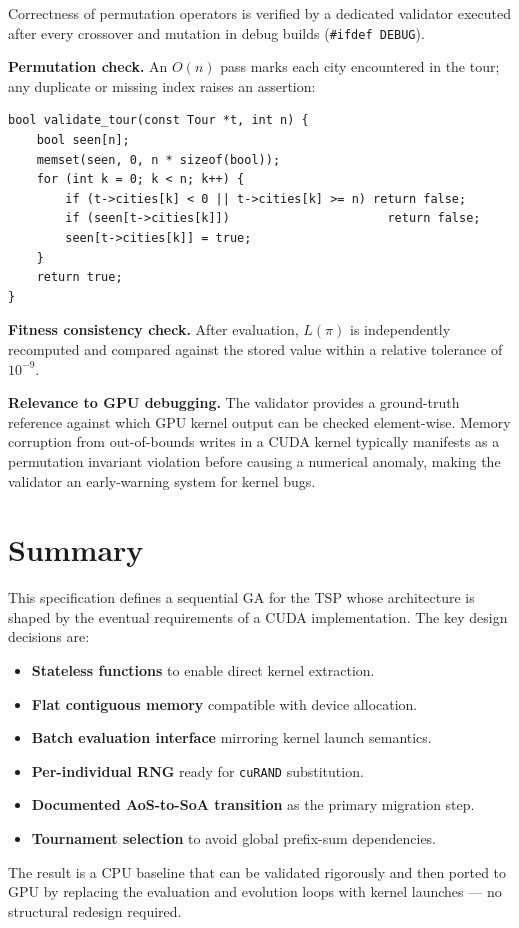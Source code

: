 \documentclass[11pt, letterpaper]{article}
\begin{document}
Correctness of permutation operators is verified by a dedicated validator
executed after every crossover and mutation in debug builds (\texttt{\#ifdef
DEBUG}).

\textbf{Permutation check.}  An $O(n)$ pass marks each city encountered in
the tour; any duplicate or missing index raises an assertion:

\begin{lstlisting}[caption={Tour validation.}]
bool validate_tour(const Tour *t, int n) {
    bool seen[n];
    memset(seen, 0, n * sizeof(bool));
    for (int k = 0; k < n; k++) {
        if (t->cities[k] < 0 || t->cities[k] >= n) return false;
        if (seen[t->cities[k]])                      return false;
        seen[t->cities[k]] = true;
    }
    return true;
}
\end{lstlisting}

\textbf{Fitness consistency check.}  After evaluation, $L(\pi)$ is
independently recomputed and compared against the stored value within a
relative tolerance of $10^{-9}$.

\textbf{Relevance to GPU debugging.}  The validator provides a ground-truth
reference against which GPU kernel output can be checked element-wise.
Memory corruption from out-of-bounds writes in a CUDA kernel typically
manifests as a permutation invariant violation before causing a numerical
anomaly, making the validator an early-warning system for kernel bugs.

\section{Summary}

This specification defines a sequential GA for the TSP whose architecture is
shaped by the eventual requirements of a CUDA implementation.  The key design
decisions are:

\begin{itemize}[noitemsep]
  \item \textbf{Stateless functions} to enable direct kernel extraction.
  \item \textbf{Flat contiguous memory} compatible with device allocation.
  \item \textbf{Batch evaluation interface} mirroring kernel launch semantics.
  \item \textbf{Per-individual RNG} ready for \texttt{cuRAND} substitution.
  \item \textbf{Documented AoS-to-SoA transition} as the primary migration
    step.
  \item \textbf{Tournament selection} to avoid global prefix-sum dependencies.
\end{itemize}

The result is a CPU baseline that can be validated rigorously and then ported
to GPU by replacing the evaluation and evolution loops with kernel launches ---
no structural redesign required.
\end{document}
